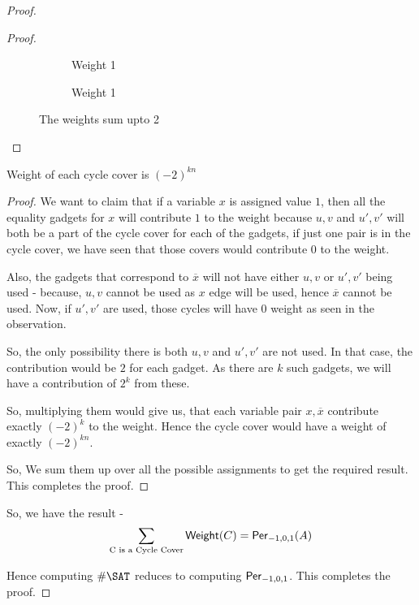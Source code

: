 \begin{proof}
\begin{proof}
\begin{figure}[h]
\begin{subfigure}[b]{0.3\textwidth}
\centering
	\caption{Weight 1}
\end{subfigure}	
\begin{subfigure}[b]{0.3\textwidth}
\centering
	\caption{Weight 1}
\end{subfigure}	
\caption{The weights sum upto 2}
\label{Fig6}
\end{figure}
\end{proof}

\begin{claim}
	Weight of each cycle cover is $(-2)^{kn}$
\end{claim}
\begin{proof}
We want to claim that if a variable $x$ is assigned value $1$, then all the equality gadgets for $x$ will contribute $1$ to the weight because $u,v$ and $u',v'$ will both be a part of the cycle cover for each of the gadgets, if just one pair is in the cycle cover, we have seen that those covers would contribute 0 to the weight. 

Also, the gadgets that correspond to $\overline{x}$ will not have either $u,v$ or $u',v'$ being used - because, $u,v$ cannot be used as $x$ edge will be used, hence $\overline{x}$ cannot be used. Now, if $u',v'$ are used, those cycles will have 0 weight as seen in the observation.

So, the only possibility there is both $u,v$ and $u',v'$ are not used. In that case, the contribution would be $2$ for each gadget. As there are $k$ such gadgets, we will have a contribution of $2^k$ from these. 

So, multiplying them would give us, that each variable pair $x,\overline{x}$ contribute exactly $(-2)^k$ to the weight. Hence the cycle cover would have a weight of exactly $(-2)^{kn}$.

So, We sum them up over all the possible assignments to get the required result. This completes the proof.

\end{proof}

So, we have the result -
\begin{equation}
{\sum_{\text{C is a Cycle Cover}} {\sf Weight}(C) }= {\sf Per}_{-1,0,1}(A)
\end{equation}

Hence computing $\#\SAT$ reduces to computing ${\sf Per}_{-1,0,1}$. This completes the proof. 
\end{proof}

